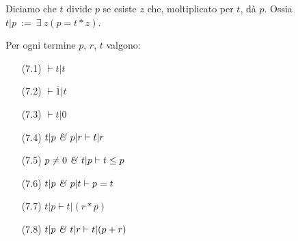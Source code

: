 \begin{defi}
Diciamo che $t$ divide $p$ se esiste $z$ che, moltiplicato per $t$, d\`a $p$. Ossia\ $t|p\ :=\ \exists\ z(p=t*z)$.
\end{defi}

\begin{prop} Per ogni termine $p$, $r$, $t$ valgono:
\vspace{.2cm}
\begin{enumerate}
	\item[(7.1)] $\vdash t|t$
	\vspace{.2cm}
	\item[(7.2)] $\vdash\overline{1}|t$
	\vspace{.2cm}
	\item[(7.3)] $\vdash t|0$
	\vspace{.2cm}
	\item[(7.4)] $t|p\ \mbox{\emph{\&}}\ p|r\vdash t|r$
	\vspace{.2cm}
	\item[(7.5)] $p\neq 0\ \mbox{\emph{\&}}\ t|p\vdash t\leq p$
	\vspace{.2cm}
	\item[(7.6)] $t|p\ \mbox{\emph{\&}}\ p|t\vdash p=t$
	\vspace{.2cm}
	\item[(7.7)] $t|p\vdash t|(r*p)$
	\vspace{.2cm}
	\item[(7.8)] $t|p\ \mbox{\emph{\&}}\ t|r\vdash t|(p+r)$
\end{enumerate}
\end{prop}

